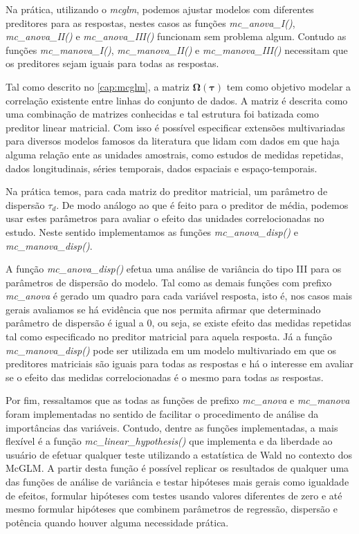 Na prática, utilizando o \emph{mcglm}, podemos ajustar modelos com diferentes preditores para as respostas, nestes casos as funções \emph{mc\_anova\_I()}, \emph{mc\_anova\_II()} e \emph{mc\_anova\_III()} funcionam sem problema algum. Contudo as funções \emph{mc\_manova\_I()}, \emph{mc\_manova\_II()} e \emph{mc\_manova\_III()} necessitam que os preditores sejam iguais para todas as respostas.

Tal como descrito no \autoref{cap:mcglm}, a matriz $\boldsymbol{\Omega({\tau})}$ tem como objetivo modelar a correlação existente entre linhas do conjunto de dados. A matriz é descrita como uma combinação de matrizes conhecidas e tal estrutura foi batizada como preditor linear matricial. Com isso é possível especificar extensões multivariadas para diversos modelos famosos da literatura que lidam com dados em que haja alguma relação ente as unidades amostrais, como estudos de medidas repetidas, dados longitudinais, séries temporais, dados espaciais e espaço-temporais.

Na prática temos, para cada matriz do preditor matricial, um parâmetro de dispersão $\tau_d$. De modo análogo ao que é feito para o preditor de média, podemos usar estes parâmetros para avaliar o efeito das unidades correlocionadas no estudo. Neste sentido implementamos as funções \emph{mc\_anova\_disp()} e \emph{mc\_manova\_disp()}. 

A função \emph{mc\_anova\_disp()} efetua uma análise de variância do tipo III para os parâmetros de dispersão do modelo. Tal como as demais funções com prefixo \emph{mc\_anova} é gerado um quadro para cada variável resposta, isto é, nos casos mais gerais avaliamos se há evidência que nos permita afirmar que determinado parâmetro de dispersão é igual a 0, ou seja, se existe efeito das medidas repetidas tal como especificado no preditor matricial para aquela resposta. Já a função \emph{mc\_manova\_disp()} pode ser utilizada em um modelo multivariado em que os preditores matriciais são iguais para todas as respostas e há o interesse em avaliar se o efeito das medidas correlocionadas é o mesmo para todas as respostas.

Por fim, ressaltamos que as todas as funções de prefixo \emph{mc\_anova} e \emph{mc\_manova} foram implementadas no sentido de facilitar o procedimento de análise da importâncias das variáveis. Contudo, dentre as funções implementadas, a mais flexível é a função \emph{mc\_linear\_hypothesis()} que implementa e da liberdade ao usuário de efetuar qualquer teste utilizando a estatística de Wald no contexto dos McGLM. A partir desta função é possível replicar os resultados de qualquer uma das funções de análise de variância e testar hipóteses mais gerais como igualdade de efeitos, formular hipóteses com testes usando valores diferentes de zero e até mesmo formular hipóteses que combinem parâmetros de regressão, dispersão e potência quando houver alguma necessidade prática.
